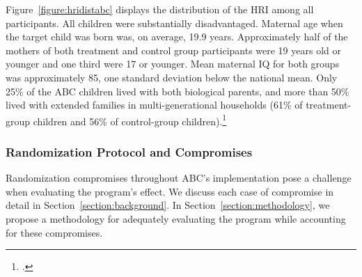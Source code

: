 \begin{appendices}
\noindent Figure~\ref{figure:hridistabc} displays the distribution of the HRI among all participants. All children were substantially disadvantaged. Maternal age when the target child was born was, on average, 19.9 years. Approximately half of the mothers of both treatment and control group participants were 19 years old or younger and one third were 17 or younger.  Mean maternal IQ for both groups was approximately 85, one standard deviation below the national mean. Only 25\% of the ABC children lived with both biological parents, and more than 50\% lived with extended families in multi-generational households (61\% of treatment-group children and 56\% of control-group children).\footnote{\citet{Ramey_Campbell_1991_childreninpoverty,Campbell_Ramey_1994_CD}.}\\

\subsubsection{Randomization Protocol and Compromises} \label{appendix:randomization}

\noindent Randomization compromises throughout ABC's implementation pose a challenge when evaluating the program's effect. We discuss each case of compromise in detail in Section~\ref{section:background}. In Section~\ref{section:methodology},  we propose a methodology for adequately evaluating the program while accounting for these compromises.


\end{appendices}
